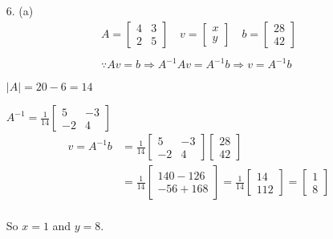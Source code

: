 \documentclass{./../../Latex/homework}
\begin{document}
\begin{enumerate}
(d) $$ H^{-1}=\left[\begin{array}{lll}1 & 0 & 0 \\ 0 & 1 & 0 \\ 0 & 0 & 1\end{array}\right] $$ \\


\item[6.] (a) $$
\begin{array}{l}
A=\left[\begin{array}{ll}
4 & 3 \\
2 & 5
\end{array}\right] \quad v=\left[\begin{array}{l}
x \\
y
\end{array}\right] \quad b=\left[\begin{array}{ll}
28 \\
42
\end{array}\right] \\~\\
\because A v=b \Rightarrow A^{-1} A v=A^{-1} b \Rightarrow v=A^{-1}b
\end{array}
$$

\(|A| =20-6=14 \)

\(A^{-1} =\frac{1}{14}\left[\begin{array}{cc}5 & -3 \\ -2 & 4\end{array}\right] \)
\[
\begin{aligned}v=A^{-1} b &=\frac{1}{14}\left[\begin{array}{cc}5 & -3 \\ -2 & 4\end{array}\right]\left[\begin{array}{l}28 \\ 42\end{array}\right] \\ &=\frac{1}{14}\left[\begin{array}{l}140-126 \\ -56+168\end{array}\right] = \frac{1}{14}\left[\begin{array}{l}14 \\ 112\end{array}\right] =\left[\begin{array}{l}1 \\ 8\end{array}\right] \end{aligned}
\]\\
So \(x=1\) and \(y=8\). \\~\\


\end{enumerate}
\end{document}
